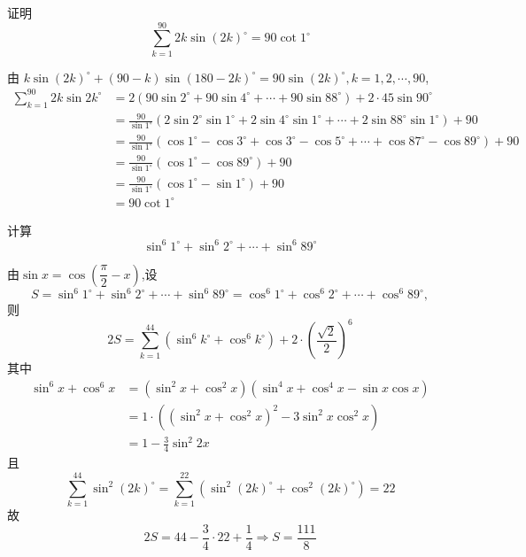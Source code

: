 \begin{questions}
    \question 证明 
    \[
    \sum_{k=1}^{90} 2k\sin (2k)^\circ=90\cot 1^\circ
    \]
    \begin{solution}
        由 $k\sin (2k)^\circ+(90-k)\sin (180-2k)^\circ=90\sin (2k)^\circ,k=1,2,\cdots,90$,
        \begin{align*}
        \sum_{k=1}^{90} 2k\sin 2k^\circ
        &= 2(90\sin 2^\circ +90\sin 4^\circ +\cdots +90\sin 88^\circ)+ 2\cdot 45\sin 90^\circ \\
        &= \frac{90}{\sin 1^\circ}(2\sin 2^\circ \sin 1^\circ +2\sin 4^\circ \sin 1^\circ +\cdots +2\sin 88^\circ \sin 1^\circ)+90 \\
        &= \frac{90}{\sin 1^\circ}( \cos 1^\circ-\cos 3^\circ +\cos 3^\circ-\cos 5^\circ +\cdots +\cos 87^\circ-\cos 89^\circ)+90 \\
        &= \frac{90}{\sin 1^\circ} (\cos 1^\circ-\cos 89^\circ)+ 90 \\
        &= \frac{90}{\sin 1^\circ} (\cos 1^\circ-\sin 1^\circ)+ 90 \\
        &= 90\cot 1^\circ
        \end{align*}
    \end{solution}

    \question 计算  
    \[
    \sin^{6}1^\circ+\sin^{6}2^\circ+\cdots+\sin^{6}89^\circ
    \]
    \begin{solution}
        由$\sin x=\cos \left(\dfrac{\pi}{2}-x\right)$,设 
        \[
        S=\sin^{6}1^\circ+\sin^{6}2^\circ+\cdots+\sin^{6}89^\circ=\cos^{6}1^\circ+\cos^{6}2^\circ+\cdots+\cos^{6}89^\circ,
        \]
        则 
        \[
        2S= \sum_{k=1}^{44} (\sin^6 k^\circ+\cos^6 k^\circ) + 2\cdot\left(\frac{\sqrt2}{2}\right)^6
        \]
        其中
        \begin{align*}
        \sin^6 x + \cos^6 x &= (\sin^2 x + \cos^2 x)(\sin^4 x + \cos^4 x-\sin x \cos x) \\
        &=1 \cdot ((\sin^2 x + \cos^2 x)^2-3\sin^2 x \cos^2 x) \\
        &=1-\frac{3}{4}\sin^2 2x 
        \end{align*}且
        \[
        \sum_{k=1}^{44} \sin^2 (2k)^\circ=\sum_{k=1}^{22} (\sin^2 (2k)^\circ+\cos^2 (2k)^\circ)=22
        \]
        故
        \[
        2S=44-\frac{3}{4}\cdot 22+\frac{1}{4} \Rightarrow S=\frac{111}{8}
        \]
    \end{solution}
        

\end{questions}
